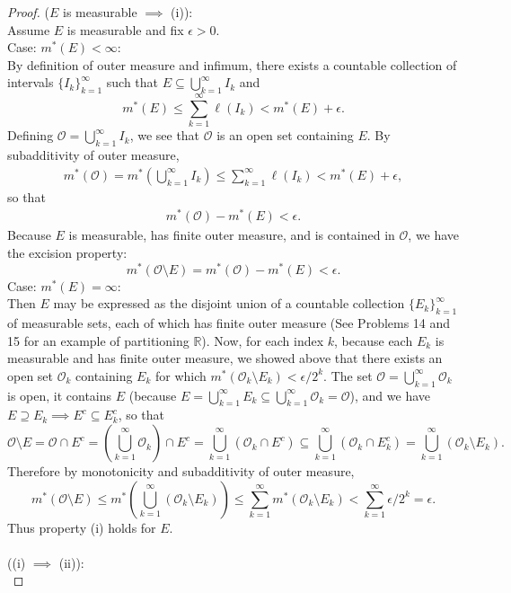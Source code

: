 \begin{proof}
	($E$ is measurable $\implies$ (i)):\\
	Assume $E$ is measurable and fix $\epsilon>0$.\\
	Case: $m^*(E)<\infty$:\\
	By definition of outer measure and infimum, there exists a countable collection of intervals $\{I_k\}_{k=1}^\infty$ such that $E\subseteq\bigcup_{k=1}^\infty I_k$ and
	\[
		m^*(E)\le\sum_{k=1}^\infty\ell(I_k)<m^*(E)+\epsilon.	
	\]
	Defining $\mathcal{O}=\bigcup_{k=1}^\infty I_k$, we see that $\mathcal{O}$ is an open set containing $E$.
	By subadditivity of outer measure,
	\begin{align*}
		m^*(\mathcal{O})=m^*(\bigcup_{k=1}^\infty I_k)\le\sum_{k=1}^\infty\ell(I_k)<m^*(E)+\epsilon,
	\end{align*}
	so that 
	\begin{align*}
		m^*(\mathcal{O})-m^*(E)<\epsilon.
	\end{align*}
	Because $E$ is measurable, has finite outer measure, and is contained in $\mathcal{O}$, we have the excision property:
	\[
		m^*(\mathcal{O}\setminus E)=m^*(\mathcal{O})-m^*(E)<\epsilon.
	\]
	Case: $m^*(E)=\infty$:\\
	Then $E$ may be expressed as the disjoint union of a countable collection $\{E_k\}_{k=1}^\infty$ of measurable sets, each of which has finite outer measure
	(See Problems 14 and 15 for an example of partitioning $\mathbb{R}$).
	Now, for each index $k$, because each $E_k$ is measurable and has finite outer measure, we showed above that there exists an open set $\mathcal{O}_k$ containing $E_k$ for which $m^*(\mathcal{O}_k\setminus E_k)<\epsilon/2^k$.
	The set $\mathcal{O}=\bigcup_{k=1}^\infty \mathcal{O}_k$ is open, it contains $E$ (because $E=\bigcup_{k=1}^\infty E_k \subseteq \bigcup_{k=1}^\infty \mathcal{O}_k =\mathcal{O}$), and we have $E\supseteq E_k \implies E^c\subseteq E_k^c$, so that
	\[
		\mathcal{O}\setminus E=\mathcal{O}\cap E^c = (\bigcup_{k=1}^\infty \mathcal{O}_k)\cap E^c = \bigcup_{k=1}^\infty (\mathcal{O}_k\cap E^c)\subseteq\bigcup_{k=1}^\infty (\mathcal{O}_k\cap E_k^c)=\bigcup_{k=1}^\infty (\mathcal{O}_k\setminus E_k).
	\]
	Therefore by monotonicity and subadditivity of outer measure,
	\[
		m^*(\mathcal{O}\setminus E)	\le m^*(\bigcup_{k=1}^\infty (\mathcal{O}_k\setminus E_k))\le\sum_{k=1}^\infty m^*(\mathcal{O}_k\setminus E_k)<\sum_{k=1}^\infty\epsilon/2^k=\epsilon.
	\]
	Thus property (i) holds for $E$.\\
	\\((i) $\implies$ (ii)):\\

\end{proof}
